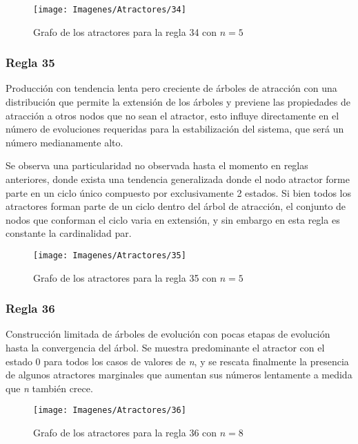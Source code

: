 \documentclass[]{article}
\begin{document}
				\hfill\break
				\hfill\break
				\hfill\break
				\begin{figure}[!h]
					\centering
					\texttt{[image: Imagenes/Atractores/34]}
					\caption{Grafo de los atractores para la regla 34 con $n=5$}
					\label{Regla_34}
				\end{figure}
				
	
			\newpage
			\subsubsection{Regla 35}
				\justifying
				Producción con tendencia lenta pero creciente de árboles de atracción con una distribución que permite la extensión de los árboles y previene las propiedades de atracción a otros nodos que no sean el atractor, esto influye directamente en el número de evoluciones requeridas para la estabilización del sistema, que será un número medianamente alto.
				
				\hfill\break
				\justifying
				Se observa una particularidad no observada hasta el momento en reglas anteriores, donde exista una tendencia generalizada donde el nodo atractor forme parte en un ciclo único compuesto por exclusivamente 2 estados. Si bien todos los atractores forman parte de un ciclo dentro del árbol de atracción, el conjunto de nodos que conforman el ciclo varia en extensión, y sin embargo en esta regla es constante la cardinalidad par.
				
				\hfill\break
				\hfill\break
				\begin{figure}[!h]
					\centering
					\texttt{[image: Imagenes/Atractores/35]}
					\caption{Grafo de los atractores para la regla 35 con $n=5$}
					\label{Regla_35}
				\end{figure}
				
			
			
			\newpage
			\subsubsection{Regla 36}
				\justifying
				Construcción limitada de árboles de evolución con pocas etapas de evolución hasta la convergencia del árbol. Se muestra predominante el atractor con el estado 0 para todos los casos de valores de \textit{n}, y se rescata finalmente la presencia de algunos atractores marginales que aumentan sus números lentamente a medida que \textit{n} también crece.
				
				\hfill\break
				\hfill\break
				\begin{figure}[!h]
					\centering
					\texttt{[image: Imagenes/Atractores/36]}
					\caption{Grafo de los atractores para la regla 36 con $n=8$}
					\label{Regla_36}
				\end{figure}
			
\end{document}
